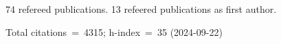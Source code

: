 74 refereed publications. 13 refeered publications as first author.

Total citations~=~4315; h-index~=~35 (2024-09-22)